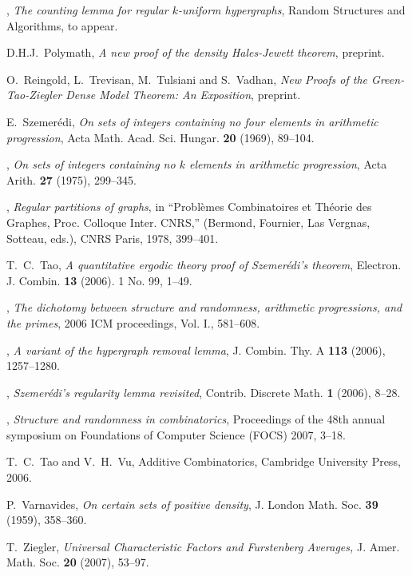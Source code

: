 \documentclass[11pt,reqno]{amsart}
\numberwithin{equation}{section}
\theoremstyle{plain}
\theoremstyle{definition}
\newcommand\1{{\bf 1}}
\newcommand\2{{\bf 2}}
\begin{document}
\begin{thebibliography}{99}
\bysame, \emph{The counting lemma for regular $k$-uniform hypergraphs}, Random
Structures and Algorithms, to appear.

D.H.J.~Polymath, \emph{A new proof of the density Hales-Jewett theorem}, preprint.

O.~Reingold, L.~Trevisan, M.~Tulsiani and S.~Vadhan, \emph{New Proofs of the Green-Tao-Ziegler Dense Model Theorem: An Exposition}, preprint.

E.~Szemer\'edi, \emph{On sets of integers containing no four elements in arithmetic progression},
Acta Math. Acad. Sci. Hungar. \textbf{20} (1969), 89--104.

\bysame, \emph{On sets of integers containing no $k$ elements in arithmetic progression},
Acta Arith. \textbf{27} (1975), 299--345.

\bysame, \emph{Regular partitions of graphs}, in ``Probl\`emes Combinatoires et Th\'eorie des Graphes, Proc. Colloque Inter. CNRS,'' (Bermond, Fournier, Las Vergnas, Sotteau, eds.), CNRS Paris, 1978, 399--401.

T.~C.~Tao, \emph{A quantitative ergodic theory proof of Szemer\'edi's theorem}, Electron. J. Combin. \textbf{13} (2006). 1 No. 99, 1--49.

\bysame, \emph{The dichotomy between structure and randomness, arithmetic progressions, and the primes}, 2006 ICM proceedings, Vol. I., 581--608.

\bysame, \emph{A variant of the hypergraph removal lemma}, J. Combin. Thy. A \textbf{113} (2006), 1257--1280.

\bysame, \emph{Szemer\'edi's regularity lemma revisited}, Contrib. Discrete Math. \textbf{1} (2006), 8--28.

\bysame, \emph{Structure and randomness in combinatorics}, Proceedings of the 48th annual symposium on Foundations of Computer Science (FOCS) 2007, 3--18.

T.~C.~Tao and V.~H.~Vu, Additive Combinatorics, Cambridge University Press, 2006.

P.~Varnavides, \emph{On certain sets of positive density}, {J. London Math. Soc.}  \textbf{39} (1959), 358--360.

 T.~Ziegler, \emph{Universal Characteristic Factors and Furstenberg Averages,} J. Amer. Math. Soc. \textbf{20} (2007), 53--97.


\end{thebibliography}
\end{document}
